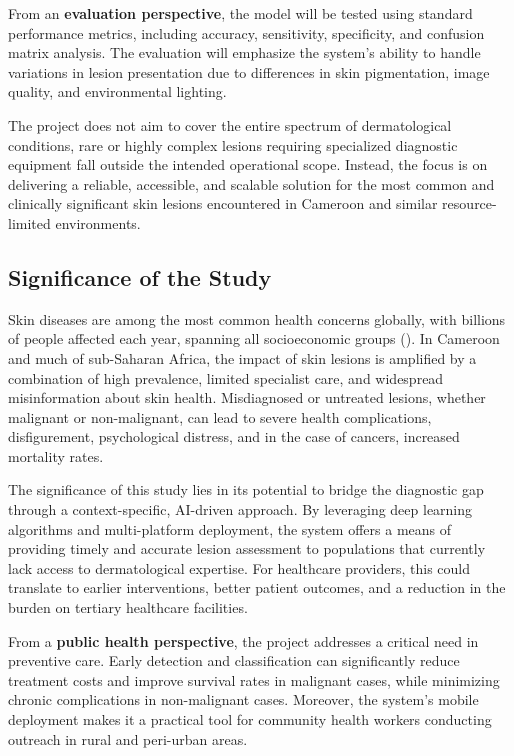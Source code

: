 \documentclass[
  12pt,
  oneside]{article}
\begin{document}
From an \textbf{evaluation perspective}, the model will be tested using
standard performance metrics, including accuracy, sensitivity,
specificity, and confusion matrix analysis. The evaluation will
emphasize the system's ability to handle variations in lesion
presentation due to differences in skin pigmentation, image quality, and
environmental lighting.

The project does not aim to cover the entire spectrum of dermatological
conditions, rare or highly complex lesions requiring specialized
diagnostic equipment fall outside the intended operational scope.
Instead, the focus is on delivering a reliable, accessible, and scalable
solution for the most common and clinically significant skin lesions
encountered in Cameroon and similar resource-limited environments.

\subsection{Significance of the Study}\label{significance-of-the-study}

Skin diseases are among the most common health concerns globally, with
billions of people affected each year, spanning all socioeconomic groups
(). In Cameroon and much of
sub-Saharan Africa, the impact of skin lesions is amplified by a
combination of high prevalence, limited specialist care, and widespread
misinformation about skin health. Misdiagnosed or untreated lesions,
whether malignant or non-malignant, can lead to severe health
complications, disfigurement, psychological distress, and in the case of
cancers, increased mortality rates.

The significance of this study lies in its potential to bridge the
diagnostic gap through a context-specific, AI-driven approach. By
leveraging deep learning algorithms and multi-platform deployment, the
system offers a means of providing timely and accurate lesion assessment
to populations that currently lack access to dermatological expertise.
For healthcare providers, this could translate to earlier interventions,
better patient outcomes, and a reduction in the burden on tertiary
healthcare facilities.

From a \textbf{public health perspective}, the project addresses a
critical need in preventive care. Early detection and classification can
significantly reduce treatment costs and improve survival rates in
malignant cases, while minimizing chronic complications in non-malignant
cases. Moreover, the system's mobile deployment makes it a practical
tool for community health workers conducting outreach in rural and
peri-urban areas.
\end{document}
